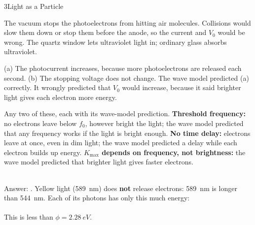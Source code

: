 \begin{chapteranswers}{3}{Light as a Particle}
  \item The vacuum stops the photoelectrons from hitting air molecules. Collisions
        would slow them down or stop them before the anode, so the current and $V_0$
        would be wrong. The quartz window lets ultraviolet light in; ordinary glass
        absorbs ultraviolet.
  \item (a) The photocurrent increases, because more photoelectrons are released
        each second. (b) The stopping voltage does not change. The wave model
        predicted (a) correctly. It wrongly predicted that $V_0$ would increase,
        because it said brighter light gives each electron more energy.
  \item Any two of these, each with its wave-model prediction.
        \textbf{Threshold frequency:} no electrons leave below $f_0$, however bright
        the light; the wave model predicted that any frequency works if the light is
        bright enough. \textbf{No time delay:} electrons leave at once, even in dim
        light; the wave model predicted a delay while each electron builds up energy.
        \textbf{$K_\mathrm{max}$ depends on frequency, not brightness:} the wave
        model predicted that brighter light gives faster electrons.
  \item {}\\[3pt]
        Answer: . Yellow light (\qty{589}{nm})
        does \textbf{not} release electrons: \qty{589}{nm} is longer than
        \qty{544}{nm}. Each of its photons has only this much energy:\\[2pt]
        \\[3pt]
        This is less than $\phi = \qty{2.28}{eV}$.
  \item {}
\end{chapteranswers}
